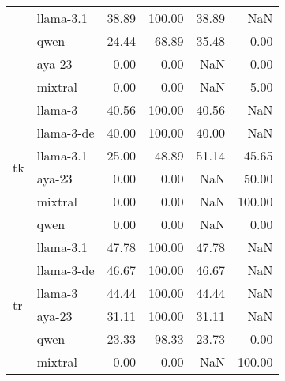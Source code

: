 \begin{tabular}{llrrrr}
 & llama-3.1 & 38.89 & 100.00 & 38.89 & NaN \\
 & qwen & 24.44 & 68.89 & 35.48 & 0.00 \\
 & aya-23 & 0.00 & 0.00 & NaN & 0.00 \\
 & mixtral & 0.00 & 0.00 & NaN & 5.00 \\
\cline{1-6}
\multirow[t]{6}{*}{tk} & llama-3 & 40.56 & 100.00 & 40.56 & NaN \\
 & llama-3-de & 40.00 & 100.00 & 40.00 & NaN \\
 & llama-3.1 & 25.00 & 48.89 & 51.14 & 45.65 \\
 & aya-23 & 0.00 & 0.00 & NaN & 50.00 \\
 & mixtral & 0.00 & 0.00 & NaN & 100.00 \\
 & qwen & 0.00 & 0.00 & NaN & 0.00 \\
\cline{1-6}
\multirow[t]{6}{*}{tr} & llama-3.1 & 47.78 & 100.00 & 47.78 & NaN \\
 & llama-3-de & 46.67 & 100.00 & 46.67 & NaN \\
 & llama-3 & 44.44 & 100.00 & 44.44 & NaN \\
 & aya-23 & 31.11 & 100.00 & 31.11 & NaN \\
 & qwen & 23.33 & 98.33 & 23.73 & 0.00 \\
 & mixtral & 0.00 & 0.00 & NaN & 100.00 \\
\cline{1-6}
\bottomrule
\end{tabular}

